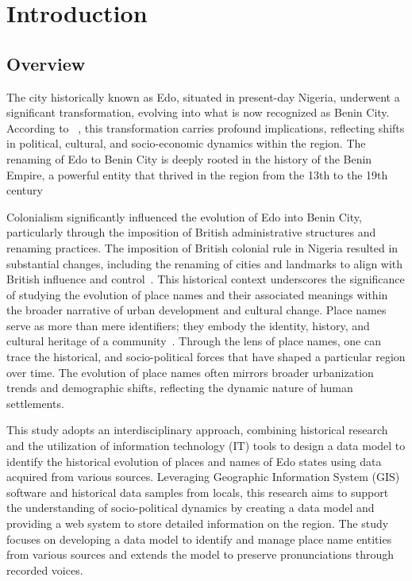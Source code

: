 \chapter{Introduction}
\section{Overview}
The city historically known as Edo, situated in present-day Nigeria, underwent a significant transformation, evolving into what is now recognized as Benin City. According to ~\cite{Michael2023}, this transformation carries profound implications, reflecting shifts in political, cultural, and socio-economic dynamics within the region. The renaming of Edo to Benin City is deeply rooted in the history of the Benin Empire, a powerful entity that thrived in the region from the 13th to the 19th century~\cite{egharevba1968short} 

Colonialism significantly influenced the evolution of Edo into Benin City, particularly through the imposition of British administrative structures and renaming practices. The imposition of British colonial rule in Nigeria resulted in substantial changes, including the renaming of cities and landmarks to align with British influence and control~\cite{falola2008history}. This historical context underscores the significance of studying the evolution of place names and their associated meanings within the broader narrative of urban development and cultural change.
Place names serve as more than mere identifiers; they embody the identity, history, and cultural heritage of a community~\cite{Gelling}. Through the lens of place names, one can trace the historical, and socio-political forces that have shaped a particular region over time. The evolution of place names often mirrors broader urbanization trends and demographic shifts, reflecting the dynamic nature of human settlements.

This study adopts an interdisciplinary approach, combining historical research and the utilization of information technology (IT) tools to design a data model to identify the historical evolution of places and names of Edo states using data acquired from various sources. Leveraging Geographic Information System (GIS) software and historical data samples from locals, this research aims to support the understanding of socio-political dynamics by creating a data model and providing a web system to store detailed information on the region.
The study focuses on developing a data model to identify and manage place name entities from various sources and extends the model to preserve pronunciations through recorded voices.

